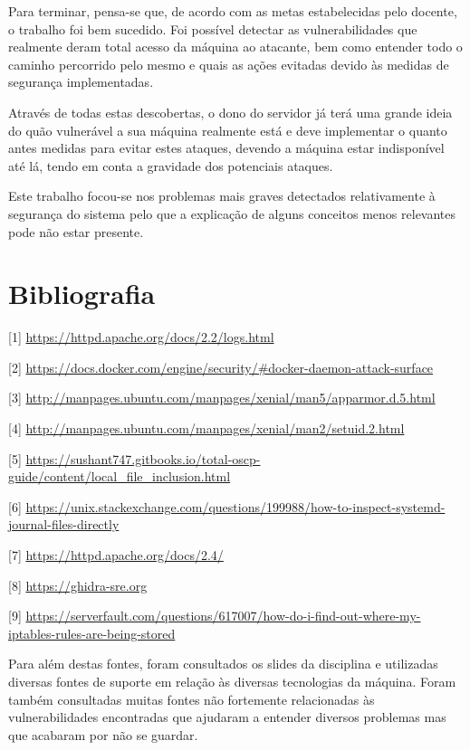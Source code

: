 \documentclass[10pt,english]{article}
\begin{document}
\par Para terminar, pensa-se que, de acordo com as metas estabelecidas pelo docente, o trabalho foi bem sucedido. Foi possível detectar as vulnerabilidades que realmente deram total acesso da máquina ao atacante, bem como entender todo o caminho percorrido pelo mesmo e quais as ações evitadas devido às medidas de segurança implementadas.

\par Através de todas estas descobertas, o dono do servidor já terá uma grande ideia do quão vulnerável a sua máquina realmente está e deve implementar o quanto antes medidas para evitar estes ataques, devendo a máquina estar indisponível até lá, tendo em conta a gravidade dos potenciais ataques.

\par Este trabalho focou-se nos problemas mais graves detectados relativamente à segurança do sistema pelo que a explicação de alguns conceitos menos relevantes pode não estar presente.

\clearpage

\section{Bibliografia}





\vspace{5mm} %

[1] \url{https://httpd.apache.org/docs/2.2/logs.html}

[2] \url{https://docs.docker.com/engine/security/#docker-daemon-attack-surface}

[3] \url{http://manpages.ubuntu.com/manpages/xenial/man5/apparmor.d.5.html}

[4] \url{http://manpages.ubuntu.com/manpages/xenial/man2/setuid.2.html}

[5] \url{https://sushant747.gitbooks.io/total-oscp-guide/content/local_file_inclusion.html}

[6] \url{https://unix.stackexchange.com/questions/199988/how-to-inspect-systemd-journal-files-directly}

[7] \url{https://httpd.apache.org/docs/2.4/}

[8] \url{https://ghidra-sre.org}

[9] \url{https://serverfault.com/questions/617007/how-do-i-find-out-where-my-iptables-rules-are-being-stored}

\par Para além destas fontes, foram consultados os slides da disciplina e utilizadas diversas fontes de suporte em relação às diversas tecnologias da máquina. Foram também consultadas muitas fontes não fortemente relacionadas às vulnerabilidades encontradas que ajudaram a entender diversos problemas mas que acabaram por não se guardar.
\end{document}
